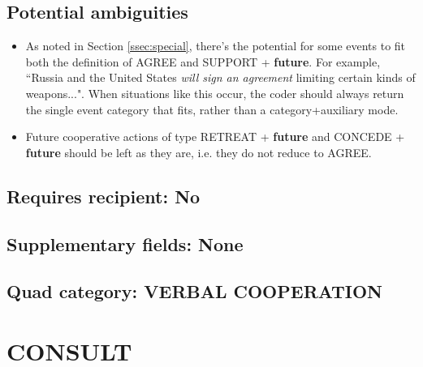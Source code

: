\documentclass[11pt]{report}
\newcommand{\plcat}[1]{\textsf{#1}}
\newcommand{\plcon}[1]{\textbf{#1}}
\begin{document}
\subsection{Potential ambiguities}

\begin{itemize}
\item As noted in Section \ref{ssec:special}, there's the potential for some events to fit both the definition of \plcat{AGREE} and \plcat{SUPPORT} + \plcon{future}. For example, ``Russia and the United States \emph{will sign an agreement} limiting certain kinds of weapons...". When situations like this occur, the coder should always return the single event category that fits, rather than a category+auxiliary mode.
\item Future cooperative actions of type \plcat{RETREAT} + \plcon{future} and \plcat{CONCEDE} + \plcon{future} should be left as they are, i.e. they do not reduce to \plcat{AGREE}.
\end{itemize}

\subsection{Requires recipient: No}

\subsection{Supplementary fields: None}

\subsection{Quad category: VERBAL COOPERATION}

\newpage

\section{CONSULT}
\end{document}
